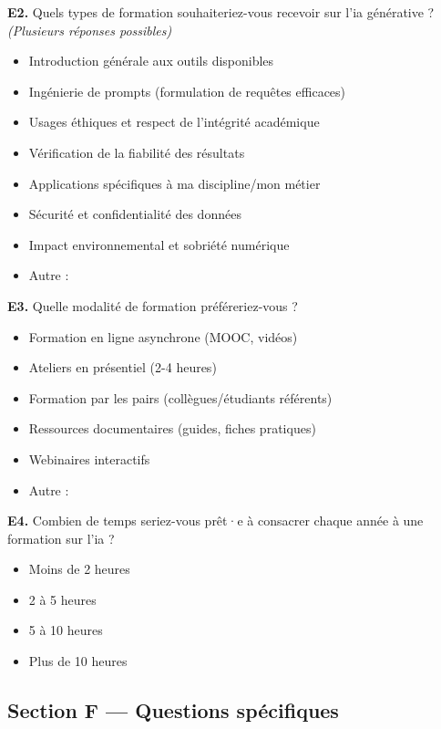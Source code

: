 \textbf{E2.} Quels types de formation souhaiteriez-vous recevoir sur l'\gls{ia} générative ? \textit{(Plusieurs réponses possibles)}
\begin{itemize}[label=$\square$, leftmargin=1.5cm]
  \item Introduction générale aux outils disponibles
  \item Ingénierie de prompts (formulation de requêtes efficaces)
  \item Usages éthiques et respect de l'intégrité académique
  \item Vérification de la fiabilité des résultats
  \item Applications spécifiques à ma discipline/mon métier
  \item Sécurité et confidentialité des données
  \item Impact environnemental et sobriété numérique
  \item Autre : \underline{\hspace{4cm}}
\end{itemize}

\textbf{E3.} Quelle modalité de formation préféreriez-vous ?
\begin{itemize}[label=$\square$, leftmargin=1.5cm]
  \item Formation en ligne asynchrone (MOOC, vidéos)
  \item Ateliers en présentiel (2-4 heures)
  \item Formation par les pairs (collègues/étudiants référents)
  \item Ressources documentaires (guides, fiches pratiques)
  \item Webinaires interactifs
  \item Autre : \underline{\hspace{4cm}}
\end{itemize}

\textbf{E4.} Combien de temps seriez-vous prêt·e à consacrer chaque année à une formation sur l'\gls{ia} ?
\begin{itemize}[label=$\square$, leftmargin=1.5cm]
  \item Moins de 2 heures
  \item 2 à 5 heures
  \item 5 à 10 heures
  \item Plus de 10 heures
\end{itemize}
 
\medskip

\subsection{Section F — Questions spécifiques}

